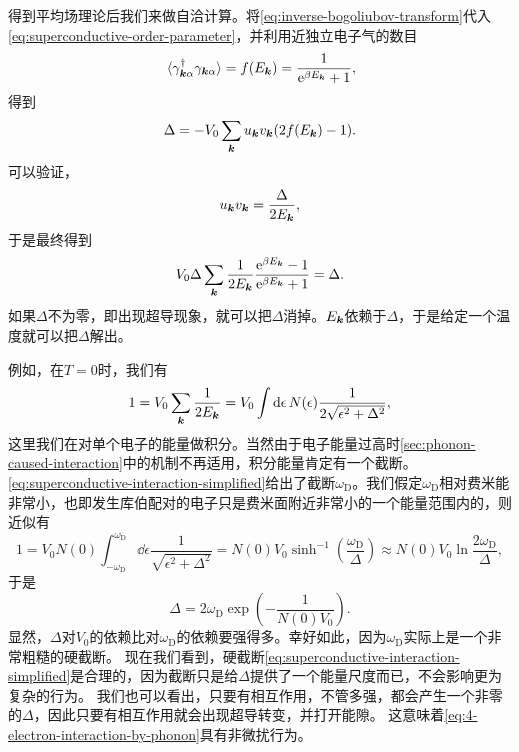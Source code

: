 得到平均场理论后我们来做自洽计算。将\eqref{eq:inverse-bogoliubov-transform}代入\eqref{eq:superconductive-order-parameter}，并利用近独立电子气的数目
\[
    \expval*{{\gamma}_{\vb*{k} \alpha}^\dagger {\gamma}_{\vb*{k} \alpha}} = f(E_{\vb*{k}}) =  \frac{1}{\mathrm{e}^{\beta E_{\vb*{k}}} + 1},
\]
得到
\[
    \Delta = - V_0 \sum_{\vb*{k}} u_{\vb*{k}} v_{\vb*{k}} (2 f(E_{\vb*{k}}) - 1).
\]
可以验证，
\[
    u_{\vb*{k}} v_{\vb*{k}} = \frac{\Delta}{2 E_{\vb*{k}}},
\]
于是最终得到
\begin{equation}
    V_0 \Delta \sum_{\vb*{k}} \frac{1}{2 E_{\vb*{k}}} \frac{\mathrm{e}^{\beta E_{\vb*{k}}} - 1}{\mathrm{e}^{\beta E_{\vb*{k}}} + 1} = \Delta.
    \label{eq:superconductive-self-consistency}
\end{equation}
如果$\Delta$不为零，即出现超导现象，就可以把$\Delta$消掉。$E_{\vb*{k}}$依赖于$\Delta$，于是给定一个温度就可以把$\Delta$解出。

例如，在$T=0$时，我们有
\[
    1 = V_0 \sum_{\vb*{k}} \frac{1}{2 E_{\vb*{k}}} = V_0 \int \dd{\epsilon} N(\epsilon) \frac{1}{2 \sqrt{\epsilon^2 + \Delta^2}},
\]
这里我们在对单个电子的能量做积分。当然由于电子能量过高时\autoref{sec:phonon-caused-interaction}中的机制不再适用，积分能量肯定有一个截断。
\eqref{eq:superconductive-interaction-simplified}给出了截断$\omega_\text{D}$。我们假定$\omega_\text{D}$相对费米能非常小，也即发生库伯配对的电子只是费米面附近非常小的一个能量范围内的，则近似有
\[
    1 = V_0 N(0) \int_{-\omega_\text{D}}^{\omega_\text{D}} \dd{\epsilon} \frac{1}{\sqrt{\epsilon^2 + \Delta^2}} = N(0) V_0 \sinh^{-1} \left( \frac{\omega_\text{D}}{\Delta} \right) \approx N(0) V_0 \ln \frac{2 \omega_\text{D}}{\Delta},
\]
于是
\begin{equation}
    \Delta = 2 \omega_\text{D} \exp(- \frac{1}{N(0) V_0}).
    \label{eq:bcs-mf-gap-function}
\end{equation}
显然，$\Delta$对$V_0$的依赖比对$\omega_\text{D}$的依赖要强得多。幸好如此，因为$\omega_\text{D}$实际上是一个非常粗糙的硬截断。
现在我们看到，硬截断\eqref{eq:superconductive-interaction-simplified}是合理的，因为截断只是给$\Delta$提供了一个能量尺度而已，不会影响更为复杂的行为。
我们也可以看出，只要有相互作用，不管多强，都会产生一个非零的$\Delta$，因此只要有相互作用就会出现超导转变，并打开能隙。
这意味着\eqref{eq:4-electron-interaction-by-phonon}具有非微扰行为。

